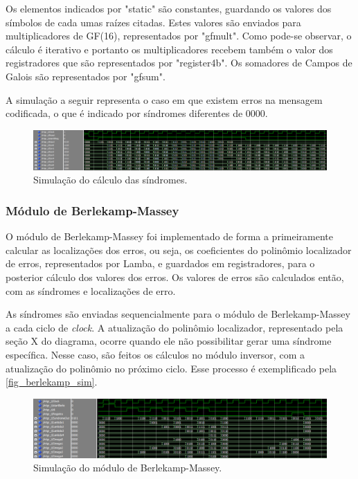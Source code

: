 	Os elementos indicados por "static" são constantes, guardando os valores dos símbolos de cada umas raízes citadas. Estes valores são enviados para multiplicadores de GF(16), representados por "gfmult". Como pode-se observar, o cálculo é iterativo e portanto os multiplicadores recebem também o valor dos registradores que são representados por "register4b". Os somadores de Campos de Galois são representados por "gfsum".
	
	A simulação a seguir representa o caso em que existem erros na mensagem codificada, o que é indicado por síndromes diferentes de 0000.
	
	\begin{figure}[h]
		\caption{\label{fig_sindrome_sim}Simulação do cálculo das síndromes.}
		\centering
		\includegraphics[width=1\textwidth]{RS/Sim_sindrome.PNG}
	\end{figure}

	\subsubsection{Módulo de Berlekamp-Massey}
	
	O módulo de Berlekamp-Massey foi implementado de forma a primeiramente calcular as localizações dos erros, ou seja, os coeficientes do polinômio localizador de erros, representados por Lamba, e guardados em registradores, para o posterior cálculo dos valores dos erros. Os valores de erros são calculados então, com as síndromes e localizações de erro.
	
	As síndromes são enviadas sequencialmente para o módulo de Berlekamp-Massey a cada ciclo de \textit{clock}. A atualização do polinômio localizador, representado pela seção X do diagrama, ocorre quando ele não possibilitar gerar uma síndrome específica. Nesse caso, são feitos os cálculos no módulo inversor, com a atualização do polinômio no próximo ciclo. Esse processo é exemplificado pela \autoref{fig_berlekamp_sim}.
	
	\begin{figure}[!htb]
		\caption{\label{fig_berlekamp_sim}Simulação do módulo de Berlekamp-Massey.}
		\centering
		\includegraphics[width=1\textwidth]{RS/Sim_berlekamp.PNG}
	\end{figure}
	
